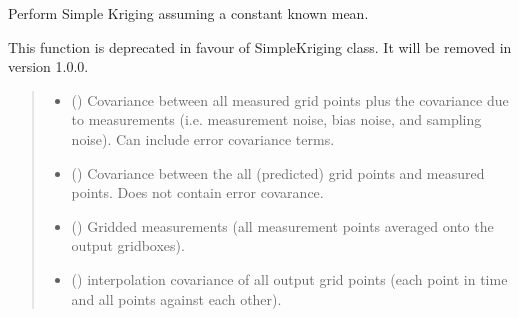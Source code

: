 \documentclass[letterpaper,10pt,english]{sphinxmanual}
\begin{document}

\begin{fulllineitems}
\label{\detokenize{kriging:glomar_gridding.kriging.kriging_simple}}
\pysigstartsignatures
\pysiglinewithargsret
{}
{\sphinxparamcomma {}\sphinxparamcomma {}\sphinxparamcomma {}\sphinxparamcomma {}}
{}
\pysigstopsignatures
\sphinxAtStartPar
Perform Simple Kriging assuming a constant known mean.

\sphinxAtStartPar
This function is deprecated in favour of SimpleKriging class. It will be
removed in version 1.0.0.
\begin{quote}\begin{description}
\begin{itemize}
\item {}
\sphinxAtStartPar
{} () \textendash{} Covariance between all measured grid points plus the
covariance due to measurements (i.e. measurement noise, bias noise, and
sampling noise). Can include error covariance terms.

\item {}
\sphinxAtStartPar
{} () \textendash{} Covariance between the all (predicted) grid points and measured points.
Does not contain error covarance.

\item {}
\sphinxAtStartPar
{} () \textendash{} Gridded measurements (all measurement points averaged onto the output
gridboxes).

\item {}
\sphinxAtStartPar
{} () \textendash{} interpolation covariance of all output grid points (each point in time
and all points against each other).


\end{itemize}
\end{description}
\end{quote}
\end{fulllineitems}
\end{document}
